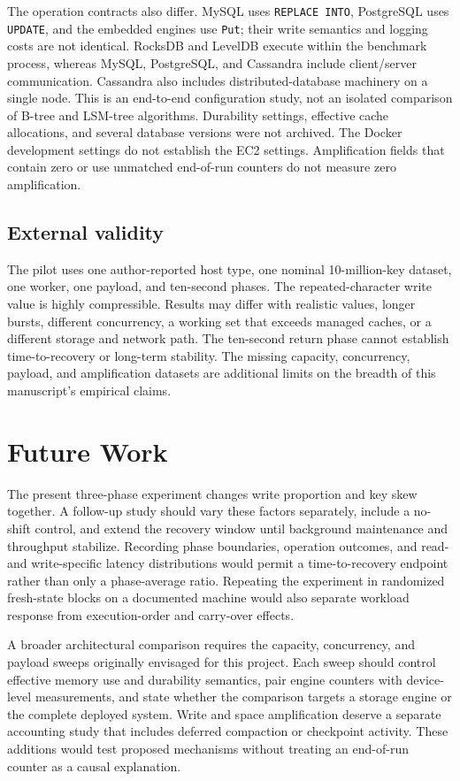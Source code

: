 \documentclass[10pt]{article}
\begin{document}
The operation contracts also differ. MySQL uses \texttt{REPLACE INTO}, PostgreSQL uses \texttt{UPDATE}, and the embedded engines use \texttt{Put}; their write semantics and logging costs are not identical. RocksDB and LevelDB execute within the benchmark process, whereas MySQL, PostgreSQL, and Cassandra include client/server communication. Cassandra also includes distributed-database machinery on a single node. This is an end-to-end configuration study, not an isolated comparison of B-tree and LSM-tree algorithms. Durability settings, effective cache allocations, and several database versions were not archived. The Docker development settings do not establish the EC2 settings. Amplification fields that contain zero or use unmatched end-of-run counters do not measure zero amplification.

\subsection{External validity}
The pilot uses one author-reported host type, one nominal 10-million-key dataset, one worker, one payload, and ten-second phases. The repeated-character write value is highly compressible. Results may differ with realistic values, longer bursts, different concurrency, a working set that exceeds managed caches, or a different storage and network path. The ten-second return phase cannot establish time-to-recovery or long-term stability. The missing capacity, concurrency, payload, and amplification datasets are additional limits on the breadth of this manuscript's empirical claims.

\section{Future Work}
The present three-phase experiment changes write proportion and key skew together. A follow-up study should vary these factors separately, include a no-shift control, and extend the recovery window until background maintenance and throughput stabilize. Recording phase boundaries, operation outcomes, and read- and write-specific latency distributions would permit a time-to-recovery endpoint rather than only a phase-average ratio. Repeating the experiment in randomized fresh-state blocks on a documented machine would also separate workload response from execution-order and carry-over effects.

A broader architectural comparison requires the capacity, concurrency, and payload sweeps originally envisaged for this project. Each sweep should control effective memory use and durability semantics, pair engine counters with device-level measurements, and state whether the comparison targets a storage engine or the complete deployed system. Write and space amplification deserve a separate accounting study that includes deferred compaction or checkpoint activity. These additions would test proposed mechanisms without treating an end-of-run counter as a causal explanation.
\end{document}
